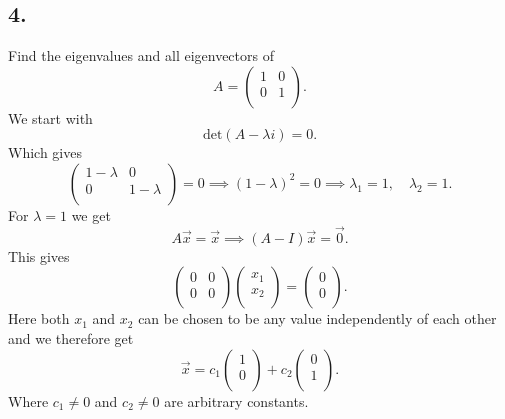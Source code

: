 \subsection*{4.} Find the eigenvalues and all eigenvectors of
\[ 
A = \begin{pmatrix}
1 & 0\\
0 & 1\\
\end{pmatrix}
.\]
\bigbreak
We start with
\[ 
\mathrm{det}(A - \lambda i) = 0
.\]
Which gives
\[ 
\begin{pmatrix}
1 - \lambda & 0\\
0 & 1 - \lambda\\
\end{pmatrix} = 0 \implies (1-\lambda)^2 = 0 \implies \lambda_1 = 1, \quad \lambda_2 = 1
.\]
For $\lambda = 1$ we get
\[ 
A \Vec{x} = \Vec{x} \implies (A - I)\Vec{x} = \Vec{0}
.\]
This gives
\[ 
\begin{pmatrix}
0 & 0\\
0 & 0\\
\end{pmatrix} \begin{pmatrix}
x_1\\
x_2\\
\end{pmatrix} = \begin{pmatrix}
0\\
0\\
\end{pmatrix}
.\]
Here both $x_1$ and $x_2$ can be chosen to be any value independently of each other and we therefore get
\[ 
\Vec{x} = c_1 \begin{pmatrix}
1\\
0\\
\end{pmatrix} + c_2 \begin{pmatrix}
0\\
1\\
\end{pmatrix}
.\]
Where $c_1 \neq 0$ and $c_2 \neq 0$ are arbitrary constants.


